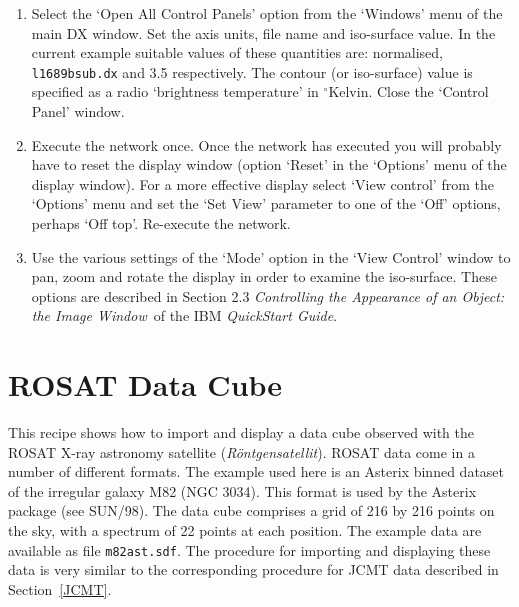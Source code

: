 \documentclass[twoside,11pt]{article}
\newcommand{\htmladdnormallink}[2]{#1}
\newcommand{\xref}[3]{#1}
\newcommand{\xlabel}[1]{}
\begin{document}
\begin{enumerate}
  \begin{enumerate}

    \item Select the `Open All Control Panels' option from the `Windows'
     menu of the main DX window.  Set the axis units, file name
     and iso-surface value.  In the current example suitable
     values of these quantities are: normalised, {\tt l1689bsub.dx} and
     3.5 respectively.
     The contour (or iso-surface) value is specified as a radio
     `brightness temperature' in $^{\circ}$Kelvin.  Close the `Control
     Panel' window.

    \item Execute the network once.  Once the network has executed you
     will probably have to reset the display window (option `Reset' in
     the `Options' menu of the display window).  For a more effective
     display select `View control' from the `Options' menu and set the
     `Set View' parameter to one of the `Off' options, perhaps `Off top'.
     Re-execute the network.

    \item Use the various settings of the `Mode' option in the `View
     Control' window to pan, zoom and rotate the display in order to
     examine the iso-surface.  These options are described in Section
     2.3 {\it Controlling the Appearance of an Object: the Image
     Window}\, of the IBM {\it QuickStart Guide}\cite{QUICKS}.

  \end{enumerate}

\end{enumerate}


\newpage
\section{\xlabel{ROSAT}\label{ROSAT}ROSAT Data Cube}

This recipe shows how to import and display a data cube observed with the
\htmladdnormallink{ROSAT}{http://heasarc.gsfc.nasa.gov/0/docs/rosat/rosat3.html}
X-ray astronomy satellite ({\it R\"{o}ntgensatellit}).  ROSAT data come
in a number of different formats.  The example used here is an Asterix
binned dataset of the irregular galaxy M82 (NGC 3034).  This format is
used by the Asterix package (see \xref{SUN/98}{sun98}{}\cite{SUN98}).
The data cube comprises a grid of 216 by 216 points on the sky, with a
spectrum of 22 points at each position.  The example data are available
as file {\tt m82ast.sdf}.  The procedure for importing and displaying these
data is very similar to the corresponding procedure for JCMT data
described in Section~\ref{JCMT}.
\end{document}
